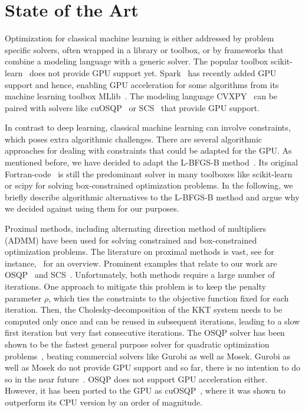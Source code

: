 \documentclass[letterpaper]{article} %
\begin{document}

\section{State of the Art}

Optimization for classical machine learning is either addressed by problem specific solvers, often wrapped in a library or toolbox, or by frameworks that combine a modeling language with a generic solver. The popular toolbox scikit-learn~\cite{scikit-learn} does not provide GPU support yet. %
Spark~\cite{ZahariaXWDADMRV16} has recently added GPU support and hence, enabling GPU acceleration for some algorithms from its machine learning toolbox MLlib~\cite{mllib}. The modeling language CVXPY~\cite{AgrawalVDB18, DiamondB16} can be paired with solvers like cuOSQP~\cite{SchubigerBL20} or SCS~\cite{ocpb:16, scs} that provide GPU support. 

In contrast to deep learning, classical machine learning can involve constraints, which poses extra algorithmic challenges. There are several algorithmic approaches for dealing with constraints that could be adapted for the GPU. As mentioned before, we have decided to adapt the \mbox{L-BFGS-B} method~\cite{ByrdLNZ95}. Its original Fortran-code~\cite{ZhuBLN97} is still the predominant solver in many toolboxes like scikit-learn or scipy for solving box-constrained optimization problems. In the following, we briefly describe algorithmic alternatives to the L-BFGS-B method and argue why we decided against using them for our purposes.   

Proximal methods, including alternating direction method of multipliers (ADMM) have been used for solving constrained and box-constrained optimization problems. The literature on proximal methods is vast, see for instance,~\cite{boydADMM, ParikhB14} for an overview. Prominent examples that relate to our work are OSQP~\cite{StellatoBGBB20} and SCS~\cite{ocpb:16, scs}. Unfortunately, both methods require a large number of iterations. One approach to mitigate this problem is to keep the penalty parameter $\rho$, which ties the constraints to the objective function fixed for each iteration. Then, the Cholesky-decomposition of the KKT system needs to be computed only once and can be reused in subsequent iterations, leading to a slow first iteration but very fast consecutive iterations. %
The OSQP solver has been shown to be the fastest general purpose solver for quadratic optimization problems~\cite{StellatoBGBB20}, beating commercial solvers like Gurobi as well as Mosek. Gurobi as well as Mosek do not provide GPU support and so far, there is no intention to do so in the near future~\cite{gurobi}. OSQP does not support GPU acceleration either. However, it has been ported to the GPU as cuOSQP~\cite{SchubigerBL20}, where it was shown to outperform its CPU version by an order of magnitude.  
\end{document}
